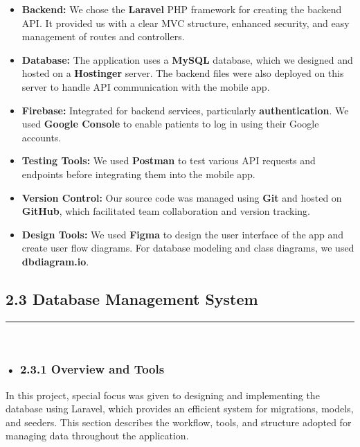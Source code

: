 \documentclass[12pt]{report}
\begin{document}
\begin{itemize}
	\item \textbf{Backend:} We chose the \textbf{Laravel} PHP framework for creating the backend API. It provided us with a clear MVC structure, enhanced security, and easy management of routes and controllers.

	\item \textbf{Database:} The application uses a \textbf{MySQL} database, which we designed and hosted on a \textbf{Hostinger} server. The backend files were also deployed on this server to handle API communication with the mobile app.

	\item \textbf{Firebase:} Integrated for backend services, particularly \textbf{authentication}. We used \textbf{Google Console} to enable patients to log in using their Google accounts.

	\item \textbf{Testing Tools:} We used \textbf{Postman} to test various API requests and endpoints before integrating them into the mobile app.

	\item \textbf{Version Control:} Our source code was managed using \textbf{Git} and hosted on \textbf{GitHub}, which facilitated team collaboration and version tracking.

	\item \textbf{Design Tools:} We used \textbf{Figma} to design the user interface of the app and create user flow diagrams. For database modeling and class diagrams, we used \textbf{dbdiagram.io}.

\end{itemize}

\subsection*{2.3 Database Management System}
\rule{0.40\linewidth}{0.5pt} \\[-1.0cm]
\subsubsection*{• 2.3.1 Overview and Tools}
In this project, special focus was given to designing and implementing the database using Laravel, which provides an efficient system for migrations, models, and seeders. This section describes the workflow, tools, and structure adopted for managing data throughout the application.
\end{document}
